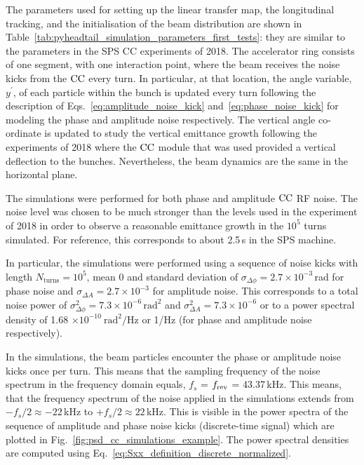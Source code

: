 The parameters used for setting up the linear transfer map, the longitudinal tracking, and the initialisation of the beam distribution are shown in Table~\ref{tab:pyheadtail_simulation_parameters_first_tests}: they are similar to the parameters in the SPS CC experiments of 2018. The accelerator ring consists of one segment, with one interaction point, where the beam receives the noise kicks from the ${\mathrm{CC}}$ every turn. In particular, at that location, the angle variable, $y^\prime$, of each particle within the bunch is updated every turn following the description of Eqs.~\eqref{eq:amplitude_noise_kick} and~\eqref{eq:phase_noise_kick} for modeling the phase and amplitude noise respectively. The vertical angle co-ordinate is updated to study the vertical emittance growth following the experiments of 2018 where the ${\mathrm{CC}}$ module that was used provided a vertical deflection to the bunches. Nevertheless, the beam dynamics are the same in the horizontal plane.

The simulations were performed for both phase and amplitude ${\mathrm{CC}}$ RF noise. The noise level was chosen to be much stronger than the levels used in the experiment of 2018 in order to observe a reasonable emittance growth in the $10^5$ turns simulated. For reference, this corresponds to about 2.5\,s in the SPS machine. 

In particular, the simulations were performed using a sequence of noise kicks with length $N_\mathrm{turns}=10^5$, mean 0 and standard deviation of $\sigma_{\Delta \phi}=2.7\times 10^{-3}$\,rad for phase noise and $\sigma_{\Delta A}=2.7\times 10^{-3}$ for amplitude noise. This corresponds to a total noise power of $\sigma_{\Delta \phi}^2 =7.3 \times 10^{-6} \, \mathrm{rad^2}$ and $\sigma_{\Delta A}^2 =7.3 \times 10^{-6}$ or to a power spectral density of 1.68 $\times 10^{-10} \ \mathrm{rad^2/Hz}$ or 1/Hz (for phase and amplitude noise respectively).


In the simulations, the beam particles encounter the phase or amplitude noise kicks once per turn. This means that the sampling frequency of the noise spectrum in the frequency domain equals, $f_s$ = ${f_\mathrm{rev}}$ = 43.37\,kHz. This means, that the frequency spectrum of the noise applied in the simulations extends from  $-f_s/2 \approx -22$\,kHz to $+f_s/2 \approx 22$\,kHz. This is visible in the power spectra of the sequence of amplitude and phase noise kicks (discrete-time signal) which are plotted in Fig.~\ref{fig:psd_cc_simulations_example}. The power spectral densities are computed using Eq.~\eqref{eq:Sxx_definition_discrete_normalized}.  


